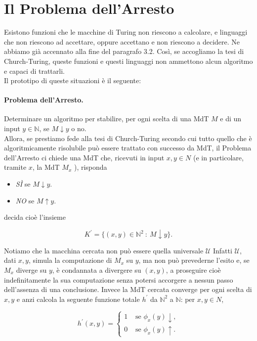 \section{Il Problema dell'Arresto}

Esistono funzioni che le macchine di Turing non riescono a calcolare, e
linguaggi che non riescono ad accettare, oppure accettano e non riescono a
decidere. Ne abbiamo già accennato alla fine del paragrafo 3.2.  %
Così, se accogliamo la tesi di Church-Turing, queste funzioni e questi
linguaggi non ammettono alcun algoritmo e capaci di trattarli.\\
Il prototipo di queste situazioni è il seguente:

\paragraph{Problema dell'Arresto.} Determinare un algoritmo per stabilire, per
ogni scelta di una MdT $M$ e di un input $y \in \mathbb{N}$, se  $M  \downarrow
    y$ o no.\\

Allora, se prestiamo fede alla tesi di Church-Turing secondo cui
tutto quello che è algoritmicamente risolubile può essere trattato con successo
da MdT, il Problema dell'Arresto ci chiede una MdT che, ricevuti in input $x, y
    \in N$ (e in particolare, tramite $x$,  la MdT $M_x$ ), risponda

\begin{itemize}
    \item \textit{SÌ} se $M \downarrow y$.
    \item \textit{NO} se $M \uparrow y$.
\end{itemize}

decida cioè l'insieme

\[
    K^{\prime} = \{(x, y) \in \mathbb{N}^2 \ : \ M \downarrow y\}.
\]

Notiamo che la macchina cercata non può essere quella universale $\mathcal{U}$
Infatti $\mathcal{U}$, dati  $x,  y$, simula la computazione di $M_x$ su $y$, ma
non può
prevederne l'esito e, se $M_x$ diverge su $y$, è condannata a divergere su $(x,
    y)$,
a proseguire cioè indefinitamente la sua computazione senza potersi accorgere a
nessun passo dell'assenza di una conclusione. Invece la MdT cercata converge per
ogni scelta di $x, y$ e anzi calcola la seguente funzione totale $h^{\prime}$ da
$\mathbb{N}^2$ a $\mathbb{N}$: per $x, y \in N$,

\[
    h^{\prime}(x, y)= \begin{cases}1 & \text { se } \phi_x(y) \downarrow, \\ 0 & \text { se } \phi_x(y) \uparrow .\end{cases}
\]

